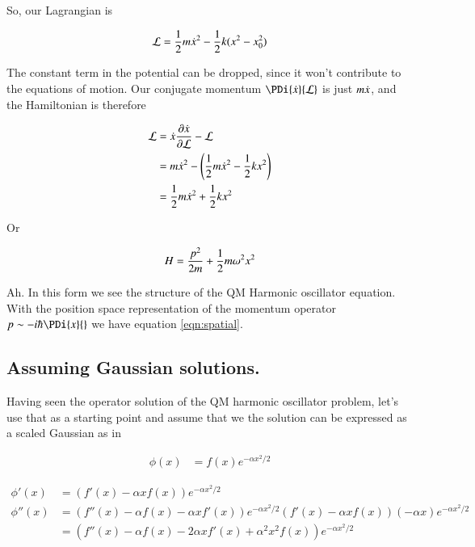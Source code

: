 \documentclass{article}
\begin{document}
So, our Lagrangian is

\begin{align*}
\mathcal{L} = \frac{1}{2}m \dot{x}^2 - \frac{1}{2} k (x^2 - x_0^2)
\end{align*}

The constant term in the potential can be dropped, since it won't contribute to the equations of motion.  Our conjugate momentum $\PDi{\xdot}{\LL}$ is just $m \dot{x}$, and the Hamiltonian
is therefore

\begin{align*}
\mathcal{L} 
&= \dot{x} \frac{\partial{\dot{x}}}{\partial {\mathcal{L}}} - \mathcal{L} \\
&= m \dot{x}^2  - \left( \frac{1}{2}m \dot{x}^2 - \frac{1}{2} k x^2 \right) \\
&= \frac{1}{2} m \dot{x}^2  + \frac{1}{2} k x^2 \\
\end{align*}

Or

\begin{align*}
H &= \frac{p^2}{2 m } + \frac{1}{2} m \omega^2 x^2 \\
\end{align*}

Ah.  In this form we see the structure of the QM Harmonic oscillator equation.  With the position space representation of the momentum operator $p \sim -i \hbar \PDi{x}{}$ we have equation
\ref{eqn:spatial}.


\subsection{ Assuming Gaussian solutions. }

Having seen the operator solution of the QM harmonic oscillator problem, let's use that as a starting point and assume that
we the solution can be expressed as a scaled Gaussian as in

\begin{align}
\phi(x) &= f(x) e^{ - \alpha x^2/2 }
\end{align}

\begin{align*}
\phi'(x) &= \left( f'(x) - \alpha x f(x) \right) e^{ - \alpha x^2/2 } \\
\phi''(x)
&=
\left( f''(x) - \alpha f(x) -\alpha x f'(x) \right) e^{ - \alpha x^2/2 }
\left( f'(x) - \alpha x f(x) \right) (-\alpha x) e^{ - \alpha x^2/2 } \\
&=
\left( f''(x) - \alpha f(x) - 2 \alpha x f'(x) + \alpha^2 x^2 f(x) \right) e^{ - \alpha x^2/2 }
\end{align*}
\end{document}
